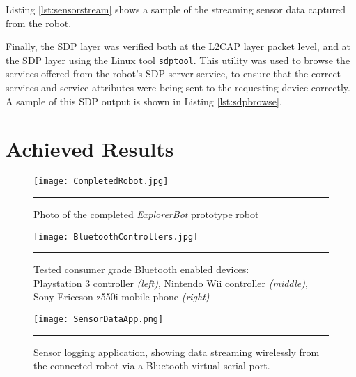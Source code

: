 

Listing \ref{lst:sensorstream} shows a sample of the streaming sensor data captured from the robot.



Finally, the SDP layer was verified both at the L2CAP layer packet level, and at the SDP layer using the Linux tool \texttt{sdptool}. This utility was used to browse the services offered from the robot's SDP server service, to ensure that the correct services and service attributes were being sent to the requesting device correctly. A sample of this SDP output is shown in Listing \ref{lst:sdpbrowse}.




\section{Achieved Results}


\begin{figure}[tbph]
	\vspace{1em}
	\centering
		\texttt{[image: CompletedRobot.jpg]}
	\rule{35em}{0.5pt}
	\caption[Photo of Completed Robot]{Photo of the completed \textit{ExplorerBot} prototype robot}
	\label{fig:completedrobot}
\end{figure}

\begin{figure}[tbph]
	\vspace{1em}
	\centering
		\texttt{[image: BluetoothControllers.jpg]}
	\rule{35em}{0.5pt}
	\caption[Tested Working Controllers]{Tested consumer grade Bluetooth enabled devices: \\ Playstation 3 controller \textit{(left)}, Nintendo Wii controller \textit{(middle)}, Sony-Ericcson z550i mobile phone \textit{(right)} }
	\label{fig:workingbtcontrollers}
\end{figure}

\begin{figure}[tbph]
	\vspace{1em}
	\centering
		\texttt{[image: SensorDataApp.png]}
	\rule{35em}{0.5pt}
	\caption[Sensor Logging Host Application]{Sensor logging application, showing data streaming wirelessly from the connected robot via a Bluetooth virtual serial port. }
	\label{fig:sensorhostapp}
\end{figure}
